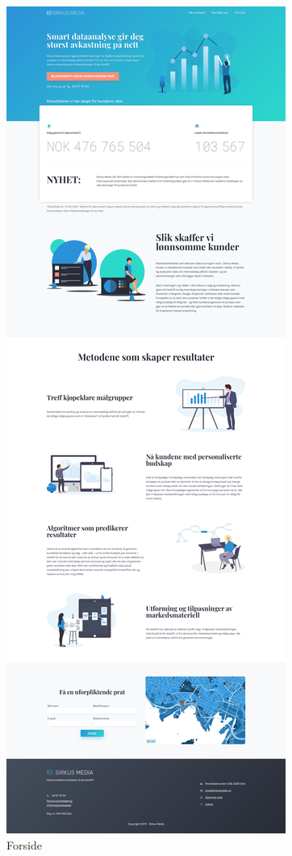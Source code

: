 \begin{figure}[H]
    \centering
    \includegraphics[height=0.8\paperheight]{website-full/01-index.png}
    \caption{Forside}
\end{figure}

